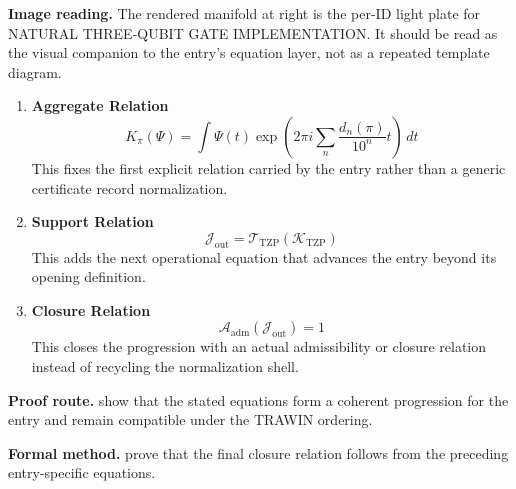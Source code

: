 \begin{samepage}
\noindent\begin{minipage}[t]{0.45\linewidth}
\vspace{0pt}
\raggedright
\scriptsize\textbf{Image reading.} The rendered manifold at right is the per-ID light plate for NATURAL THREE-QUBIT GATE IMPLEMENTATION. It should be read as the visual companion to the entry's equation layer, not as a repeated template diagram.\par
\end{minipage}\hfill
\begin{minipage}[t]{0.53\linewidth}
\vspace*{-0.10in}
\raggedright
{}
\end{minipage}
\end{samepage}

\clearpage


\begin{enumerate}[leftmargin=1.6em,itemsep=9pt,topsep=6pt]
\item \textbf{Aggregate Relation}
\[
K_\pi(\Psi)=
\int \Psi(t)\exp\!\left(2\pi i\sum_n\frac{d_n(\pi)}{10^n}t\right)\,dt
\]
This fixes the first explicit relation carried by the entry rather than a generic certificate record normalization.

\item \textbf{Support Relation}
\[
\mathcal{J}_{\mathrm{out}} = \mathcal{T}_{\mathrm{TZP}}\!\left(\mathcal{K}_{\mathrm{TZP}}\right)
\]
This adds the next operational equation that advances the entry beyond its opening definition.

\item \textbf{Closure Relation}
\[
\mathcal{A}_{\mathrm{adm}}\!\left(\mathcal{J}_{\mathrm{out}}\right)=1
\]
This closes the progression with an actual admissibility or closure relation instead of recycling the normalization shell.
\end{enumerate}

\textbf{Proof route.} show that the stated equations form a coherent progression for the entry and remain compatible under the TRAWIN ordering.

\textbf{Formal method.} prove that the final closure relation follows from the preceding entry-specific equations.

\medskip
{}

